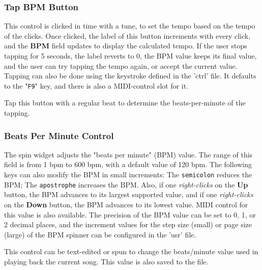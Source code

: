\subsubsection{Tap BPM Button}
\label{subsubsec:introduction_tap_bpm_button}

   This control is clicked in time with a tune, to set the
   tempo based on the tempo of the clicks.  Once clicked, the label of this
   button increments with every click, and the \textbf{BPM} field updates to
   display the calculated tempo.  If the user stops tapping for 5 seconds, the
   label reverts to 0, the BPM value keeps its final value, and the user can
   try tapping the tempo again, or accept the current value.
   Tapping can also be done using the keystroke defined
   in the 'ctrl' file.
   It defaults to the "\texttt{F9}" key, and
   there is also a MIDI-control slot for it.

   Tap this button with a regular beat to determine the beats-per-minute of the
   tapping.

\subsubsection{Beats Per Minute Control}
\label{subsubsec:introduction_bpm_control}

   The spin widget adjusts the "beats per minute" (BPM) value.  The
   range of this field is from 1 bpm to 600 bpm, with a default value of
   120 bpm.
   The following keys can also modify the BPM in small increments:
   The \texttt{semicolon} reduces the BPM;
   The \texttt{apostrophe} increases the BPM.
   Also, if one \textsl{right-clicks} on the
   \textbf{Up} button, the BPM advances to its largest
   supported value, and if one \textsl{right-clicks} on the
   \textbf{Down} button, the BPM
   advances to its lowest value.
   MIDI control for this value is also available.
   The precision of the BPM value can be set to 0, 1, or 2
   decimal places, and the increment values for the step size (small)
   or page size (large) of the BPM spinner can be configured in the 'usr' file.

   This control can be text-edited or spun to change the beats/minute value
   used in playing back the current song.  This value is also saved to the
   file.

